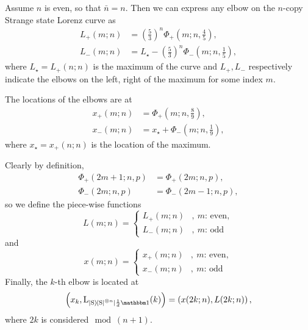 \documentclass[pra,
aps,
twocolumn,
superscriptaddress,
groupedaddress,
nofootinbib,
reprint
]{revtex4-1}
\begin{document}

Assume $n$ is even, so that $\bar n = n$.
Then we can express any elbow on the $n$-copy Strange state Lorenz curve as
\begin{align}
	L_+(m; n) &= \left(\frac{5}{3}\right)^n \Phi_+\left(m;n,\frac{4}{5}\right), \label{eq:leftelb}\\
	L_-(m; n) &= L_\star - \left(\frac{5}{3}\right)^n \Phi_-\left(m;n,\frac{1}{5}\right), \label{eq:rightelb}
\end{align}
where $L_\star = L_+(n; n)$ is the maximum of the curve and $L_+, L_-$ respectively indicate the elbows on the left, right of the maximum for some index $m$.

The locations of the elbows are at
\begin{align}
	x_+(m; n) &= \Phi_+\left(m;n,\frac{8}{9}\right), \\
	x_-(m; n) &= x_\star + \Phi_-\left(m;n,\frac{1}{9}\right),
\end{align}
where $x_\star = x_+(n; n)$ is the location of the maximum.

Clearly by definition, 
\begin{align}
	\Phi_+(2m+1;n,p) &= \Phi_+(2m;n,p), \\
	\Phi_-(2m;n,p) &= \Phi_-(2m-1;n,p),
\end{align}
so we define the piece-wise functions
\begin{equation}
	L(m;n) =
	\begin{cases}
	L_+(m; n)&,\ m\text{: even}, \\
	L_-(m; n)&,\ m\text{: odd}
	\end{cases}
\end{equation}
and
\begin{equation}
	x(m;n) =
	\begin{cases}
	x_+(m; n)&,\ m\text{: even}, \\
	x_-(m; n)&,\ m\text{: odd}
	\end{cases}
\end{equation}
Finally, the $k$-th elbow is located at
\begin{equation}
	\left(x_k, \lc{\ketbra{\rm{S}}^{\otimes n}}{\frac{1}{d}\id}(k) \right) = \left( x(2k;n), L(2k;n) \right),
\end{equation}
where $2k$ is considered$\mod{(n+1)}$.
\end{document}

